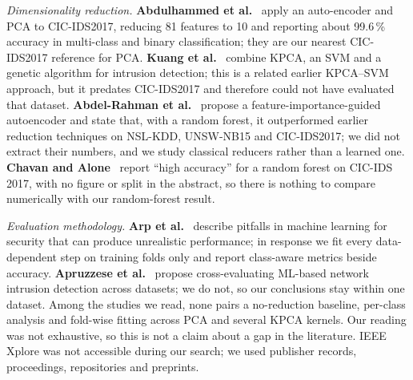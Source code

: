 \documentclass[runningheads]{llncs}
\begin{document}
\textit{Dimensionality reduction.} \textbf{Abdulhammed et al.}~\cite{abdulhammed2019} apply an auto-encoder and PCA to CIC-IDS2017, reducing 81 features to 10 and reporting about 99.6\,\% accuracy in multi-class and binary classification; they are our nearest CIC-IDS2017 reference for PCA. \textbf{Kuang et al.}~\cite{kuang2014} combine KPCA, an SVM and a genetic algorithm for intrusion detection; this is a related earlier KPCA--SVM approach, but it predates CIC-IDS2017 and therefore could not have evaluated that dataset. \textbf{Abdel-Rahman et al.}~\cite{abdelrahman2026} propose a feature-importance-guided autoencoder and state that, with a random forest, it outperformed earlier reduction techniques on NSL-KDD, UNSW-NB15 and CIC-IDS2017; we did not extract their numbers, and we study classical reducers rather than a learned one. \textbf{Chavan and Alone}~\cite{chavan2025} report ``high accuracy'' for a random forest on CIC-IDS 2017, with no figure or split in the abstract, so there is nothing to compare numerically with our random-forest result.

\textit{Evaluation methodology.} \textbf{Arp et al.}~\cite{arp2022} describe pitfalls in machine learning for security that can produce unrealistic performance; in response we fit every data-dependent step on training folds only and report class-aware metrics beside accuracy. \textbf{Apruzzese et al.}~\cite{apruzzese2022} propose cross-evaluating ML-based network intrusion detection across datasets; we do not, so our conclusions stay within one dataset. Among the studies we read, none pairs a no-reduction baseline, per-class analysis and fold-wise fitting across PCA and several KPCA kernels. Our reading was not exhaustive, so this is not a claim about a gap in the literature. IEEE Xplore was not accessible during our search; we used publisher records, proceedings, repositories and preprints.
\end{document}
